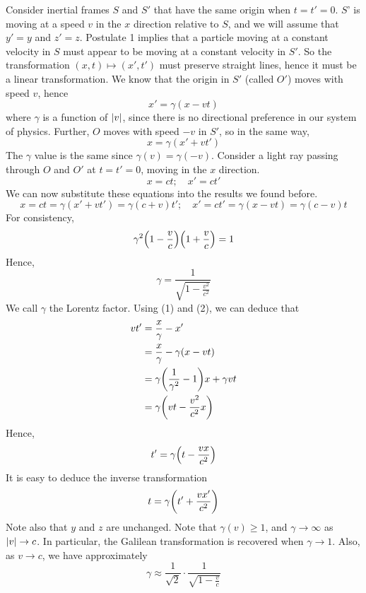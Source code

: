 Consider inertial frames \(S\) and \(S'\) that have the same origin when \(t=t'=0\).
\(S\)' is moving at a speed \(v\) in the \(x\) direction relative to \(S\), and we will assume that \(y' = y\) and \(z' = z\).
Postulate 1 implies that a particle moving at a constant velocity in \(S\) must appear to be moving at a constant velocity in \(S'\).
So the transformation \((x, t) \mapsto (x', t')\) must preserve straight lines, hence it must be a linear transformation.
We know that the origin in \(S'\) (called \(O'\)) moves with speed \(v\), hence
\begin{equation}
	x' = \gamma(x - vt) \tag{1}
\end{equation}
where \(\gamma\) is a function of \(\abs{v}\), since there is no directional preference in our system of physics.
Further, \(O\) moves with speed \(-v\) in \(S'\), so in the same way,
\begin{equation}
	x = \gamma(x' + vt') \tag{2}
\end{equation}
The \(\gamma\) value is the same since \(\gamma(v) = \gamma(-v)\).
Consider a light ray passing through \(O\) and \(O'\) at \(t=t'=0\), moving in the \(x\) direction.
\[
	x = ct;\quad x' = ct'
\]
We can now substitute these equations into the results we found before.
\[
	x = ct = \gamma(x' + vt') = \gamma(c + v)t';\quad x' = ct' = \gamma(x - vt) = \gamma(c - v)t
\]
For consistency,
\[
	\gamma^2 \qty(1 - \frac{v}{c})\qty(1 + \frac{v}{c}) = 1
\]
Hence,
\[
	\gamma = \frac{1}{\sqrt{1 - \frac{v^2}{c^2}}}
\]
We call \(\gamma\) the Lorentz factor.
Using (1) and (2), we can deduce that
\begin{align*}
	vt' & = \frac{x}{\gamma} - x'                         \\
	    & = \frac{x}{\gamma} - \gamma(x - vt)             \\
	    & = \gamma\qty(\frac{1}{\gamma^2}-1)x + \gamma vt \\
	    & = \gamma\qty(vt - \frac{v^2}{c^2}x)             \\
\end{align*}
Hence,
\[
	t' = \gamma\qty(t - \frac{vx}{c^2})
\]
It is easy to deduce the inverse transformation
\[
	t = \gamma\qty(t' + \frac{vx'}{c^2})
\]
Note also that \(y\) and \(z\) are unchanged.
Note that \(\gamma(v) \geq 1\), and \(\gamma \to \infty\) as \(\abs{v} \to c\).
In particular, the Galilean transformation is recovered when \(\gamma \to 1\).
Also, as \(v \to c\), we have approximately
\[
	\gamma \approx \frac{1}{\sqrt{2}} \cdot \frac{1}{\sqrt{1 - \frac{v}{c}}}
\]

